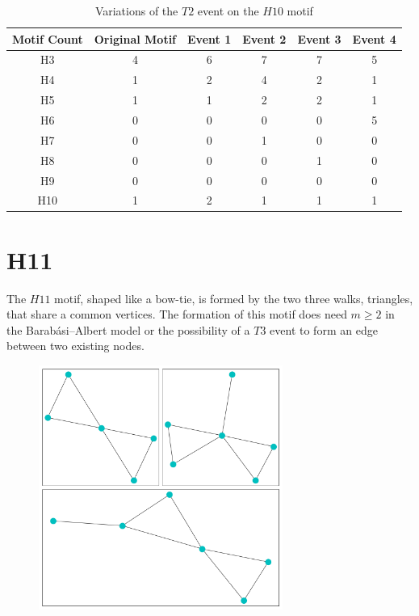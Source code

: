 \begin{table}
    \centering
    \begin{tabular}{||c c c c c c ||} 
    \hline
    Motif Count & Original Motif & Event 1 & Event 2 & Event 3  & Event 4 \\ [0.5ex] 
    \hline\hline
    H3 & 4 & 6 & 7 & 7  & 5\\
    \hline
    H4 & 1 & 2 & 4 & 2  & 1\\
    \hline
    H5 & 1 & 1 & 2 & 2 & 1\\
    \hline
    H6 & 0 & 0 & 0 & 0  & 5\\
    \hline
    H7 & 0 & 0 & 1 & 0 & 0 \\
    \hline
    H8 & 0 & 0 & 0 & 1 & 0 \\
    \hline
    H9 & 0 & 0 & 0 & 0  & 0 \\
    \hline
    H10 & 1 & 2 & 1 & 1 & 1 \\
    \hline
   \end{tabular}
   \caption{Variations of the $T2$ event on the $H10$ motif}
   \label{table:8}
\end{table}

\FloatBarrier

\section{H11}
The $H11$ motif, shaped like a bow-tie, is formed by the two three walks, triangles, that share a common
vertices. The formation of this motif does need $m \geq 2$ in the Barabási–Albert model or 
the possibility of a $T3$ event to form an edge between two existing nodes. 

\begin{figure}[!ht]
    \includegraphics[width=8cm]{Images/H11_evolution.png}
    \centering
\end{figure}

